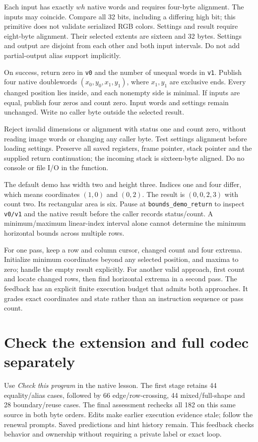 Each input has exactly $wh$ native words and requires four-byte alignment. The
inputs may coincide. Compare all 32 bits, including a differing high bit; this
primitive does not validate serialized RGB colors. Settings and result require
eight-byte alignment. Their selected extents are sixteen and 32 bytes. Settings
and output are disjoint from each other and both input intervals. Do not add
partial-output alias support implicitly.

On success, return zero in \texttt{v0} and the number of unequal words in
\texttt{v1}. Publish four native doublewords $(x_0,y_0,x_1,y_1)$, where
$x_1,y_1$ are exclusive ends. Every changed position lies inside, and each
nonempty side is minimal. If inputs are equal, publish four zeros and count
zero. Input words and settings remain unchanged. Write no caller byte outside
the selected result.

Reject invalid dimensions or alignment with status one and count zero, without
reading image words or changing any caller byte. Test settings alignment before
loading settings. Preserve all saved registers, frame pointer, stack pointer and
the supplied return continuation; the incoming stack is sixteen-byte aligned.
Do no console or file I/O in the function.

The default demo has width two and height three. Indices one and four differ,
which means coordinates $(1,0)$ and $(0,2)$. The result is $(0,0,2,3)$ with
count two. Its rectangular area is six. Pause at
\texttt{bounds\_demo\_return} to inspect \texttt{v0/v1} and the native result
before the caller records status/count. A minimum/maximum linear-index interval
alone cannot determine the minimum horizontal bounds across multiple rows.

For one pass, keep a row and column cursor, changed count and four extrema.
Initialize minimum coordinates beyond any selected position, and maxima to zero;
handle the empty result explicitly. For another valid approach, first count and
locate changed rows, then find horizontal extrema in a second pass. The feedback
has an explicit finite execution budget that admits both approaches. It grades
exact coordinates and state rather than an instruction sequence or pass count.

\section{Check the extension and full codec separately}

Use \emph{Check this program} in the native lesson. The first stage retains
44 equality/alias cases, followed by 66 edge/row-crossing, 44 mixed/full-shape
and 28 boundary/reuse cases. The final assessment rechecks all 182 on this same
source in both byte orders. Edits make earlier execution evidence stale; follow
the renewal prompts. Saved predictions and hint history remain. This feedback
checks behavior and ownership without requiring a private label or exact loop.

